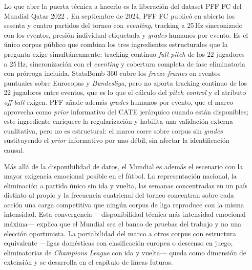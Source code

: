 Lo que abre la puerta técnica a hacerlo es la liberación del dataset
PFF FC del Mundial Qatar 2022 \parencite{PFFFC2024Release}.
En septiembre de 2024, PFF FC publicó en abierto los sesenta y cuatro
partidos del torneo con \textit{eventing}, tracking a 25\,Hz
sincronizado con los eventos, presión individual etiquetada y
\textit{grades} humanos por evento. Es el único corpus público que
combina los tres ingredientes estructurales que la pregunta exige
simultáneamente: tracking continuo \textit{full-pitch} de los 22
jugadores a 25\,Hz, sincronización con el \textit{eventing} y
cobertura completa de fase eliminatoria con prórroga incluida.
StatsBomb 360 cubre los \textit{freeze-frames} en eventos puntuales
sobre Eurocopas y \textit{Bundesliga}, pero no aporta tracking
continuo de los 22 jugadores entre eventos, que es lo que el cálculo
del \textit{pitch control} y el atributo \textit{off-ball} exigen. PFF añade además \textit{grades} humanos por evento,
que el marco aprovecha como \textit{prior} informativo del CATE
jerárquico cuando están disponibles; este ingrediente enriquece la
regularización y habilita una validación externa cualitativa, pero
no es estructural: el marco corre sobre corpus sin \textit{grades}
sustituyendo el \textit{prior} informativo por uno débil, sin afectar
la identificación causal.

Más allá de la disponibilidad de datos, el Mundial es además el
escenario con la mayor exigencia emocional posible en el fútbol. La
representación nacional, la eliminación a partido único sin ida y
vuelta, las semanas concentradas en un país distinto al propio y la
frecuencia cuatrienal del torneo concentran sobre cada acción una
carga competitiva que ningún corpus de liga reproduce con la misma
intensidad. Esta convergencia ---disponibilidad técnica más intensidad
emocional máxima--- explica que el Mundial sea el banco de pruebas
del trabajo y no una elección oportunista. La portabilidad del marco a
otros corpus con estructura equivalente ---ligas domésticas con
clasificación europea o descenso en juego, eliminatorias de
\textit{Champions League} con ida y vuelta--- queda como dimensión
de extensión y se desarrolla en el capítulo de líneas futuras.

